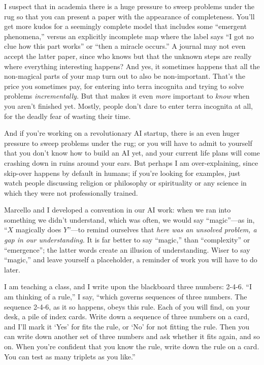 {
 I suspect that in academia there is a huge pressure to sweep
problems under the rug so that you can present a paper with the
appearance of completeness. You'll get more kudos for a
seemingly complete model that includes some ``emergent
phenomena,'' versus an explicitly incomplete map
where the label says ``I got no clue how this part
works'' or ``then a miracle
occurs.'' A journal may not even accept the latter
paper, since who knows but that the unknown steps are really where
everything interesting happens? And yes, it sometimes happens that all
the non-magical parts of your map turn out to also be non-important.
That's the price you sometimes pay, for entering into
terra incognita and trying to solve problems \textit{incrementally.}
But that makes it even \textit{more} important to \textit{know} when
you aren't finished yet. Mostly, people
don't dare to enter terra incognita at all, for the
deadly fear of wasting their time.}

{
 And if you're working on a revolutionary AI
startup, there is an even huger pressure to sweep problems under the
rug; or you will have to admit to yourself that you
don't know how to build an AI yet, and your current
life plans will come crashing down in ruins around your ears. But
perhaps I am over-explaining, since skip-over happens by default in
humans; if you're looking for examples, just watch
people discussing religion or philosophy or spirituality or any science
in which they were not professionally trained.}

{
 Marcello and I developed a convention in our AI work: when we ran
into something we didn't understand, which was often,
we would say ``magic''---as in,
``$X$ magically does $Y$''---to remind
ourselves that \textit{here was an unsolved problem, a gap in our
understanding.} It is far better to say
``magic,'' than
``complexity'' or
``emergence''; the latter words
create an illusion of understanding. Wiser to say
``magic,'' and leave yourself a
placeholder, a reminder of work you will have to do later.}

\myendsectiontext

\label{positive_bias}

{
 I am teaching a class, and I write upon the blackboard three
numbers: 2-4-6. ``I am thinking of a
rule,'' I say, ``which governs
sequences of three numbers. The sequence 2-4-6, as it so happens, obeys
this rule. Each of you will find, on your desk, a pile of index cards.
Write down a sequence of three numbers on a card, and
I'll mark it `Yes' for
fits the rule, or `No' for not fitting
the rule. Then you can write down another set of three numbers and ask
whether it fits again, and so on. When you're confident
that you know the rule, write down the rule on a card. You can test as
many triplets as you like.'' }

